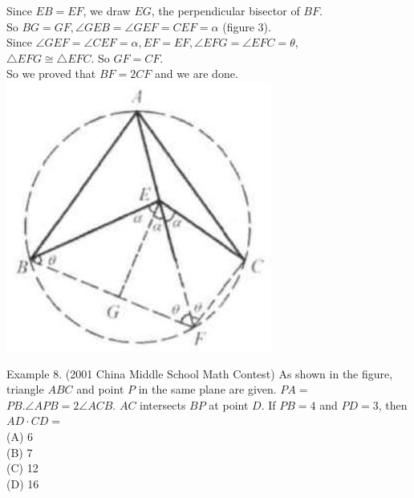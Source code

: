 \documentclass[10pt]{article}
\begin{document}
Since \(E B=E F\), we draw \(E G\), the perpendicular bisector of \(B F\).\\
So \(B G=G F, \angle G E B=\angle G E F=C E F=\alpha\) (figure 3).\\
Since \(\angle G E F=\angle C E F=\alpha, E F=E F, \angle E F G=\angle E F C=\theta\),\\
\(\triangle E F G \cong \triangle E F C\). So \(G F=C F\).\\
So we proved that \(B F=2 C F\) and we are done.\\
\includegraphics[max width=\textwidth, center]{2025_04_17_97bc1f7e44d93c271a88g-202(3)}


Example 8. (2001 China Middle School Math Contest) As shown in the figure, triangle \(A B C\) and point \(P\) in the same plane are given. \(P A=\) \(P B . \angle A P B=2 \angle A C B\). \(A C\) intersects \(B P\) at point \(D\). If \(P B=4\) and \(P D=3\), then \(A D \cdot C D=\)\\
(A) 6\\
(B) 7\\
(C) 12\\
(D) 16
\end{document}
